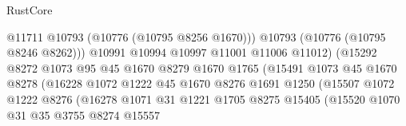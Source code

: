 \begin{lexlean}{RustCore}
\begin{coremodule}
                                            @11711
                                            @10793
                                            (@10776 (@10795 @8256 @1670)))
                                          @10793
                                          (@10776 (@10795 @8246 @8262)))
                                        @10991
                                        @10994
                                        @10997
                                        @11001
                                        @11006
                                        @11012)
                                      (@15292
                                        @8272
                                        @1073
                                        @95
                                        @45
                                        @1670
                                        @8279
                                        @1670
                                        @1765
                                        (@15491
                                          @1073
                                          @45
                                          @1670
                                          @8278
                                          (@16228
                                            @1072
                                            @1222
                                            @45
                                            @1670
                                            @8276
                                            @1691
                                            @1250
                                            (@15507
                                              @1072
                                              @1222
                                              @8276
                                              (@16278
                                                @1071
                                                @31
                                                @1221
                                                @1705
                                                @8275
                                                @15405
                                                (@15520
                                                  @1070
                                                  @31
                                                  @35
                                                  @3755
                                                  @8274
                                                  @15557

\end{coremodule}
\end{lexlean}
